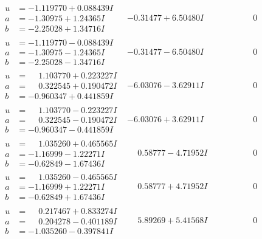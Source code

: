 \documentclass[1p]{elsarticle_modified}
\theoremstyle{definition}
\begin{document}
$$\begin{array}{c|c|c}
\begin{aligned}
u &= -1.119770 + 0.088439 I \\
a &= -1.30975 + 1.24365 I \\
b &= -2.25028 + 1.34716 I\end{aligned}
 & -0.31477 + 6.50480 I & \phantom{-0.000000 } 0 \\ \hline\begin{aligned}
u &= -1.119770 - 0.088439 I \\
a &= -1.30975 - 1.24365 I \\
b &= -2.25028 - 1.34716 I\end{aligned}
 & -0.31477 - 6.50480 I & \phantom{-0.000000 } 0 \\ \hline\begin{aligned}
u &= \phantom{-}1.103770 + 0.223227 I \\
a &= \phantom{-}0.322545 + 0.190472 I \\
b &= -0.960347 + 0.441859 I\end{aligned}
 & -6.03076 - 3.62911 I & \phantom{-0.000000 } 0 \\ \hline\begin{aligned}
u &= \phantom{-}1.103770 - 0.223227 I \\
a &= \phantom{-}0.322545 - 0.190472 I \\
b &= -0.960347 - 0.441859 I\end{aligned}
 & -6.03076 + 3.62911 I & \phantom{-0.000000 } 0 \\ \hline\begin{aligned}
u &= \phantom{-}1.035260 + 0.465565 I \\
a &= -1.16999 - 1.22271 I \\
b &= -0.62849 - 1.67436 I\end{aligned}
 & \phantom{-}0.58777 - 4.71952 I & \phantom{-0.000000 } 0 \\ \hline\begin{aligned}
u &= \phantom{-}1.035260 - 0.465565 I \\
a &= -1.16999 + 1.22271 I \\
b &= -0.62849 + 1.67436 I\end{aligned}
 & \phantom{-}0.58777 + 4.71952 I & \phantom{-0.000000 } 0 \\ \hline\begin{aligned}
u &= \phantom{-}0.217467 + 0.833274 I \\
a &= \phantom{-}0.204278 - 0.401189 I \\
b &= -1.035260 - 0.397841 I\end{aligned}
 & \phantom{-}5.89269 + 5.41568 I & \phantom{-0.000000 } 0 \\ \hline\begin{aligned}

\end{aligned}
\end{array}$$
\end{document}
